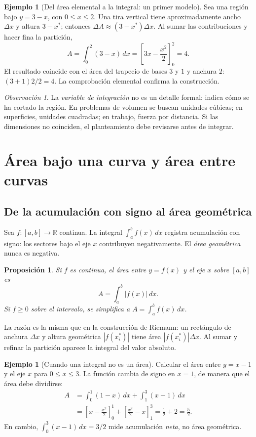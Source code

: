 \documentclass[12pt]{article}
\newtheorem{proposicion}[teorema]{Proposición}
\theoremstyle{definition}
\newtheorem{ejemplo}[teorema]{Ejemplo}
\theoremstyle{remark}
\newtheorem*{observacion}{Observación}
\newcommand{\R}{\mathbb{R}}
\newcommand{\dd}{\,dx}
\begin{document}
\begin{ejemplo}[Del área elemental a la integral: un primer modelo]
Sea una región bajo $y=3-x$, con $0\leq x\leq2$. Una tira vertical tiene aproximadamente ancho $\Delta x$ y altura $3-x^*$; entonces $\Delta A\approx (3-x^*)\Delta x$. Al sumar las contribuciones y hacer fina la partición,
\[
A=\int_0^2(3-x)\,dx
=\left[3x-\frac{x^2}{2}\right]_0^2=4.
\]
El resultado coincide con el área del trapecio de bases $3$ y $1$ y anchura $2$: $(3+1)2/2=4$. La comprobación elemental confirma la construcción.
\end{ejemplo}

\begin{observacion}
La \emph{variable de integración} no es un detalle formal: indica cómo se ha cortado la región. En problemas de volumen se buscan unidades cúbicas; en superficies, unidades cuadradas; en trabajo, fuerza por distancia. Si las dimensiones no coinciden, el planteamiento debe revisarse antes de integrar.
\end{observacion}



\section{Área bajo una curva y área entre curvas}
\subsection*{De la acumulación con signo al área geométrica}
Sea $f:[a,b]\to\R$ continua. La integral $\int_a^b f(x)\dd$ registra acumulación con signo: los sectores bajo el eje $x$ contribuyen negativamente. El \emph{área geométrica} nunca es negativa.
\begin{proposicion}
Si $f$ es continua, el área entre $y=f(x)$ y el eje $x$ sobre $[a,b]$ es
\[\boxed{A=\int_a^b |f(x)|\dd.}\]
Si $f\geq0$ sobre el intervalo, se simplifica a $A=\int_a^b f(x)\dd$.
\end{proposicion}
La razón es la misma que en la construcción de Riemann: un rectángulo de anchura $\Delta x$ y altura geométrica $|f(x_i^*)|$ tiene área $|f(x_i^*)|\Delta x$. Al sumar y refinar la partición aparece la integral del valor absoluto.

\begin{ejemplo}[Cuando una integral no es un área]
Calcular el área entre $y=x-1$ y el eje $x$ para $0\leq x\leq3$. La función cambia de signo en $x=1$, de manera que el área debe dividirse:
\begin{align*}
A&=\int_0^1(1-x)\dd+\int_1^3(x-1)\dd\\
 &=\left[x-\frac{x^2}{2}\right]_0^1+\left[\frac{x^2}{2}-x\right]_1^3
 =\frac12+2=\boxed{\frac52}.
\end{align*}
En cambio, $\int_0^3(x-1)\dd=3/2$ mide acumulación \emph{neta}, no área geométrica.
\end{ejemplo}
\end{document}
